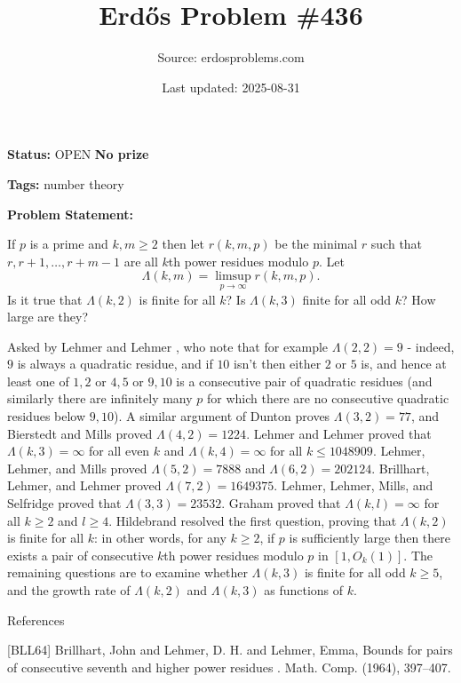 \documentclass{article}
\title{Erd\H{o}s Problem \#436}
\date{Last updated: 2025-08-31}
\author{Source: erdosproblems.com}
\begin{document}
\maketitle

\noindent\textbf{Status:} OPEN \quad \textbf{No prize}

\noindent\textbf{Tags:} number theory

\medskip

\noindent\textbf{Problem Statement:}

If $p$ is a prime and $k,m\geq 2$ then let $r(k,m,p)$ be the minimal $r$ such that $r,r+1,\ldots,r+m-1$ are all $k$th power residues modulo $p$. Let\[\Lambda(k,m)=\limsup_{p\to \infty} r(k,m,p).\]Is it true that $\Lambda(k,2)$ is finite for all $k$? Is $\Lambda(k,3)$ finite for all odd $k$? How large are they?




Asked by Lehmer and Lehmer \cite{LeLe62}, who note that for example $\Lambda(2,2)=9$ - indeed, $9$ is always a quadratic residue, and if $10$ isn't then either $2$ or $5$ is, and hence at least one of $1,2$ or $4,5$ or $9,10$ is a consecutive pair of quadratic residues (and similarly there are infinitely many $p$ for which there are no consecutive quadratic residues below $9,10$). A similar argument of Dunton \cite{Du65} proves $\Lambda(3,2)=77$, and Bierstedt and Mills \cite{BiMi63} proved $\Lambda(4,2)=1224$. Lehmer and Lehmer proved that $\Lambda(k,3)=\infty$ for all even $k$ and $\Lambda(k,4)=\infty$ for all $k\leq 1048909$. Lehmer, Lehmer, and Mills \cite{LLM63} proved $\Lambda(5,2)=7888$ and $\Lambda(6,2)=202124$. Brillhart, Lehmer, and Lehmer \cite{BLL64} proved $\Lambda(7,2)=1649375$. Lehmer, Lehmer, Mills, and Selfridge \cite{LLMS62} proved that $\Lambda(3,3)=23532$. Graham \cite{Gr64g} proved that $\Lambda(k,l)=\infty$ for all $k\geq 2$ and $l\geq 4$. Hildebrand \cite{Hi91} resolved the first question, proving that $\Lambda(k,2)$ is finite for all $k$: in other words, for any $k\geq 2$, if $p$ is sufficiently large then there exists a pair of consecutive $k$th power residues modulo $p$ in $[1,O_k(1)]$. The remaining questions are to examine whether $\Lambda(k,3)$ is finite for all odd $k\geq 5$, and the growth rate of $\Lambda(k,2)$ and $\Lambda(k,3)$ as functions of $k$.




References

[BLL64] Brillhart, John and Lehmer, D. H. and Lehmer, Emma, Bounds for pairs of consecutive seventh and higher power residues . Math. Comp. (1964), 397--407.
\end{document}
